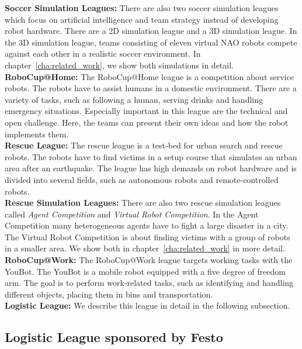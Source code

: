 \textbf{Soccer Simulation Leagues:} There are also two soccer simulation leagues which focus on artificial intelligence and team strategy instead of developing robot hardware. There are a 2D simulation league and a 3D simulation league. In the 3D simulation league, teams consisting of eleven virtual NAO robots compete against each other in a realistic soccer environment. In chapter~\ref{cha:related_work}, we show both simulations in detail.\\
\textbf{RoboCup@Home:} The RoboCup@Home league is a competition about service robots. The robots have to assist humans in a domestic environment. There are a variety of tasks, such as following a human, serving drinks and handling emergency situations. Especially important in this league are the technical and open challenge. Here, the teams can present their own ideas and how the robot implements them.\\
\textbf{Rescue League:} The rescue league is a test-bed for urban search and rescue robots. The robots have to find victims in a setup course that simulates an urban area after an earthquake. The league has high demands on robot hardware and is divided into several fields, such as autonomous robots and remote-controlled robots. \\
\textbf{Rescue Simulation Leagues:} There are also two rescue simulation leagues called \textit{Agent Competition} and \textit{Virtual Robot Competition}. In the Agent Competition many heterogeneous agents have to fight a large disaster in a city. The Virtual Robot Competition is about finding victims with a group of robots in a smaller area. We show both in chapter~\ref{cha:related_work} in more detail.\\
\textbf{RoboCup@Work:} The RoboCup@Work league targets working tasks with the YouBot. The YouBot is a mobile robot equipped with a five degree of freedom arm. The goal is to perform work-related tasks, such as identifying and handling different objects, placing them in bins and transportation.\\
\textbf{Logistic League:} We describe this league in detail in the following subsection.\\

\subsection{Logistic League sponsored by Festo}

